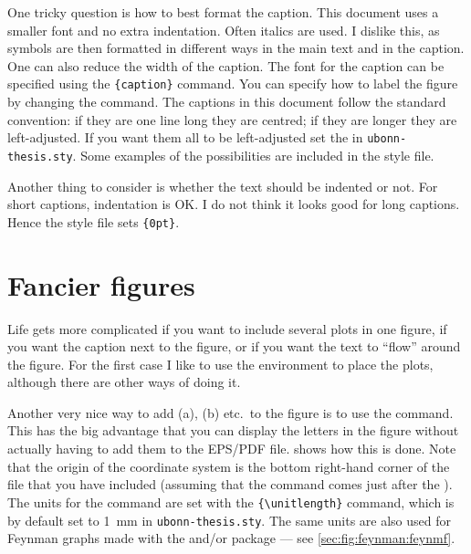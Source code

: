 One tricky question is how to best format the caption. This document
uses a smaller font and no extra indentation. Often italics are
used. I dislike this, as symbols are then formatted in different ways
in the main text and in the caption. One can also reduce the width of
the caption. The font for the caption can be specified using the
\texttt{\{caption\}} command. You can specify how
to label the figure by changing the  command. The
captions in this document follow the standard \KOMAScript{}
convention: if they are one line long they are centred; if they are
longer they are left-adjusted. If you want them all to be
left-adjusted set the  
in \texttt{ubonn-thesis.sty}. Some examples of the possibilities are
included in the style file.

Another thing to consider is whether the text should be indented or
not. For short captions, indentation is OK\@. I do not think it looks
good for long captions. Hence the style file sets
\texttt{\{0pt\}}.

\section{Fancier figures}%
\label{sec:fig:fancy}

Life gets more complicated if you want to include several plots in
one figure, if you want the caption next to the figure, or if you want
the text to \enquote{flow} around the figure. For the first case I like to
use the  environment to place the plots, although
there are other ways of doing it.

Another very nice way to add (a), (b) etc.\ to the figure is to use the
 command. This has the big advantage that you can display
the letters in the figure without actually having to add them to the
EPS/PDF file.  shows how this is done. Note
that the origin of the coordinate system is the bottom right-hand
corner of the file that you have included (assuming that the
 command comes just after the ).
The units for the  command are set with the
\texttt{\{\textbackslash unitlength\}} command, which
is by default set to \SI{1}{\mm} in \texttt{ubonn-thesis.sty}. The
same units are also used for Feynman graphs made with the
 and/or  package --- see
\cref{sec:fig:feynman:feynmf}.

